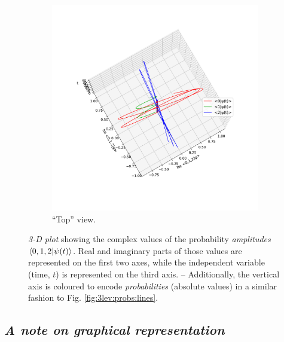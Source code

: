 \begin{figure}[h]
\begin{subfigure}[b]{\textwidth}
    \includegraphics[height=0.41\textheight,clip,trim= 20 120 20 220]{img/3ldetect/hermitianSpaceTime_top.pdf}
    \caption{``Top'' view.}
  \end{subfigure}
  \caption{
    \textit{3-D plot} showing the complex values of the
    probability \emph{amplitudes} $\braket{0, 1, 2}{\psi(t)}$.
    Real and imaginary parts of those values are represented on
    the first two axes, while the independent variable (time, $t$)
    is represented
    on the third axis.
    -- Additionally, the vertical axis is coloured to encode \emph{probabilities}
    (absolute values)
    in a similar fashion to Fig. \ref{fig:3lev:probs:lines}. 
  }
  \label{fig:3lev:hermitianEvol}
\end{figure}

\subsection*{\textit{A note on graphical representation}}

